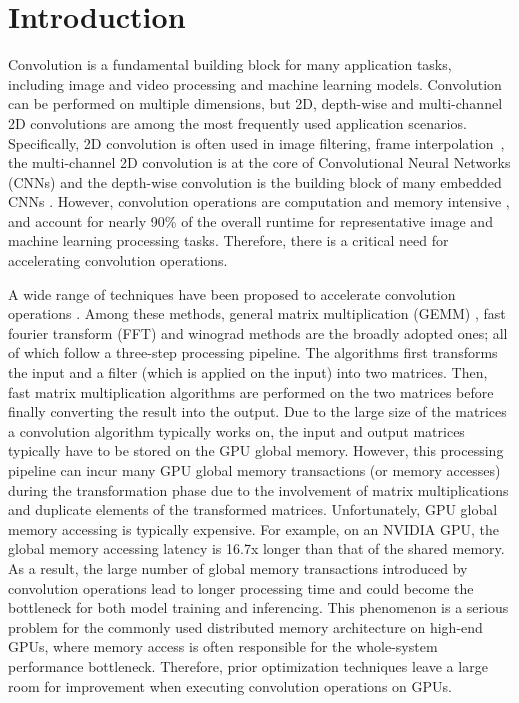 \section{Introduction}
Convolution is a fundamental building block for many application tasks, including image and video processing and machine learning models.
Convolution can be performed on multiple dimensions, but 2D, depth-wise and multi-channel 2D convolutions are among the most frequently used application
scenarios. Specifically, 2D convolution is often used in image filtering, frame
interpolation~\cite{Perrot2014Fine,Ma2014Optimized,Rudi2015Image,Niklaus2017Video},  the multi-channel 2D convolution is at the core of Convolutional Neural Networks (CNNs)
\cite{Krizhevsky2012ImageNet,SimonyanZ14a,HeZRS16,SzegedyLJSRAEVR15} and the depth-wise convolution is the building block of many embedded CNNs
\cite{Sandler_2018_CVPR,Ma_2018_ECCV,tan2019efficientnet}. However, convolution operations are computation and memory intensive
\cite{cavigelli2015accelerating}, and account for nearly 90\% of the overall runtime \cite{Li2016Performance} for representative image and
machine learning processing tasks. Therefore, there is a critical need for accelerating convolution operations.



A wide range of techniques have been proposed to accelerate convolution operations
\cite{Iandola2014Communication,vasilache2014fast,lavin2016fast,cho2017mec,Zhen2018Optimizing,Vasudevan2017Parallel,Chellapilla2006High,zhang2015dwarfcode}.
Among these methods, general matrix multiplication (GEMM) \cite{Vasudevan2017Parallel,Chellapilla2006High}, fast fourier transform (FFT)
\cite{vasilache2014fast} and winograd \cite{lavin2016fast} methods are the broadly adopted ones;  all of which follow a three-step
processing pipeline. The algorithms first transforms the input and a filter (which is applied on the input) into two matrices. Then, fast
matrix multiplication algorithms \cite{karstadt2017matrix,scott2015matrix} are performed on the two matrices before finally converting the
result into the output. Due to the large size of the matrices a convolution algorithm typically works on, the input and output matrices
typically have to be stored on the GPU global memory. However, this processing pipeline can incur many GPU global memory transactions (or
memory accesses) during the transformation phase due to the involvement of matrix multiplications and duplicate elements of the transformed
matrices. Unfortunately, GPU global memory accessing is typically expensive. For example, on an NVIDIA GPU, the global memory accessing
latency is 16.7x longer than that of the shared memory. As a result, the large number of global memory transactions introduced by
convolution operations lead to longer processing time and could become the bottleneck for both model training and inferencing.  This
phenomenon is a serious problem for the commonly used distributed memory architecture on high-end GPUs, where memory access is often
responsible for the whole-system performance bottleneck. Therefore, prior optimization techniques leave a large room for improvement when
executing convolution operations on GPUs.


